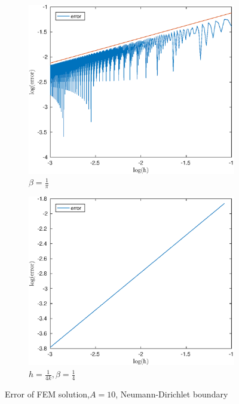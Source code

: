 \documentclass[12pt]{article}
\begin{document}
\begin{figure}[h!]
\centering
\begin{subfigure}{0.4\textwidth}
\includegraphics[width=\textwidth]{error-pi-ND}
\caption{$\beta=\frac{1}{\pi}$}
\end{subfigure}
\hfill
\begin{subfigure}{0.4\textwidth}
\includegraphics[width=\textwidth]{error-4-ND}
\caption{$h=\frac{1}{4k},\beta=\frac{1}{4}$}
\end{subfigure}
\caption{Error of FEM solution,$A=10$, Neumann-Dirichlet boundary}
\end{figure}
\end{document}
